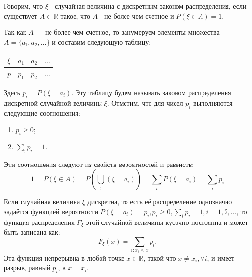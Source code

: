 \begin{definition}
	Говорим, что $\xi$ - случайная величина с дискретным законом распределения, если существует $A \subset \mathbb{R}$ такое, что $A$ - не более чем счетное и $P(\xi \in A) = 1$.
	
	Так как $A$ — не более чем счетное, то занумеруем элементы множества $A = \{ a_1, a_2, \dots \}$ и составим следующую таблицу:
	\begin{table}[H]
		\centering
		\begin{tabular}{|c|c|c|c|}
			\hline
			$\xi$ & $a_1$ & $a_2$ & $\dots$ \\ \hline
			$p$   & $p_1$ & $p_2$ & $\dots$ \\ \hline
		\end{tabular}
	\end{table}
	Здесь $p_i = P(\xi = a_i)$. Эту таблицу будем называть законом распределения дискретной случайной величины $\xi$. Отметим, что для чисел $p_i$ выполняются следующие соотношения:
	\begin{enumerate}
		\item $p_i \ge 0$;
		\item $\sum\limits_{i} p_i = 1$.
	\end{enumerate}
	Эти соотношения следуют из свойств вероятностей и равенств:
	\[ 1 = P(\xi \in A) = P \left( \bigcup_i (\xi = a_i) \right) = \sum_{i} P(\xi = a_i) = \sum_{i} p_i \]
\end{definition}

Если случайная величина $\xi$ дискретна, то есть её распределение однозначно задаётся функцией вероятности $P(\xi = a_i) = p_i, p_i \ge 0, \sum\limits_i p_i = 1, i = 1,2,\dots$, то функция распределения $F_{\xi}$ этой случайной величины кусочно-постоянна и может быть записана как:
\[ F_{\xi} (x) = \sum_{i: x_i \le x} p_i. \]
Эта функция непрерывна в любой точке $x \in \mathbb{R}$, такой что $x \ne x_i, \forall i$, и имеет разрыв, равный $p_i$, в $x = x_i$.

